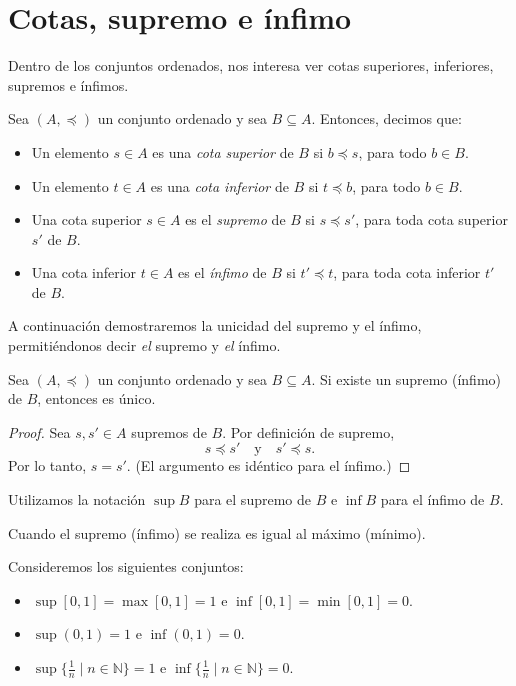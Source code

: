 \section{Cotas, supremo e ínfimo}

Dentro de los conjuntos ordenados, nos interesa ver cotas superiores, inferiores, supremos e ínfimos.

\begin{definition}
	Sea $(A, \preceq)$ un conjunto ordenado y sea $B \subseteq A$. Entonces, decimos que:
	\begin{itemize}
		\item Un elemento $s \in A$ es una \emph{cota superior} de $B$ si $b \preceq s$, para todo $b \in B$.
		\item Un elemento $t \in A$ es una \emph{cota inferior} de $B$ si $t \preceq b$, para todo $b \in B$.
		\item Una cota superior $s \in A$ es el \emph{supremo} de $B$ si $s \preceq s'$, para toda cota superior $s'$ de $B$.
		\item Una cota inferior $t \in A$ es el \emph{ínfimo} de $B$ si $t' \preceq t$, para toda cota inferior $t'$ de $B$.
	\end{itemize}
\end{definition}

A continuación demostraremos la unicidad del supremo y el ínfimo, permitiéndonos decir \textit{el} supremo y \textit{el} ínfimo.

\begin{proposition}
	Sea $(A, \preceq)$ un conjunto ordenado y sea $B \subseteq A$. Si existe un supremo (ínfimo) de $B$, entonces es único.
\end{proposition}

\begin{proof}
	Sea $s, s' \in A$ supremos de $B$. Por definición de supremo,
	\begin{equation*}
		s \preceq s' \quad \text{y} \quad s' \preceq s.
	\end{equation*}
	Por lo tanto, $s = s'$. (El argumento es idéntico para el ínfimo.)
\end{proof}

Utilizamos la notación $\sup B$ para el supremo de $B$ e $\inf B$ para el ínfimo de $B$.

\begin{remark}
	Cuando el supremo (ínfimo) se realiza es igual al máximo (mínimo).
\end{remark}

\begin{example}
	Consideremos los siguientes conjuntos:
	\begin{itemize}
		\item $\sup [0, 1] = \max [0, 1] = 1$ e $\inf [0, 1] = \min [0, 1] = 0$.
		\item $\sup (0, 1) = 1$ e $\inf (0, 1) = 0$.
		\item $\sup\{ \frac{1}{n} \mid n \in \mathbb{N} \} = 1$ e $\inf\{ \frac{1}{n} \mid n \in \mathbb{N} \} = 0$.
	\end{itemize}
\end{example}

